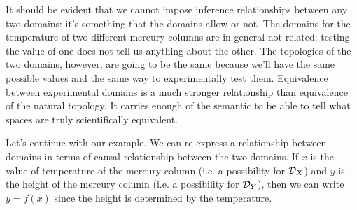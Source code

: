 \documentclass[11pt,letterpaper,fleqn]{memoir} %
\begin{document}
\begin{center}
\end{center}


It should be evident that we cannot impose inference relationships between any two domains: it's something that the domains allow or not. The domains for the temperature of two different mercury columns are in general not related: testing the value of one does not tell us anything about the other. The topologies of the two domains, however, are going to be the same because we'll have the same possible values and the same way to experimentally test them. Equivalence between experimental domains is a much stronger relationship than equivalence of the natural topology. It carries enough of the semantic to be able to tell what spaces are truly scientifically equivalent.

Let's continue with our example. We can re-express a relationship between domains in terms of causal relationship between the two domains. If $x$ is the value of temperature of the mercury column (i.e. a possibility for $\mathcal{D}_X$) and $y$ is the height of the mercury column (i.e. a possibility for $\mathcal{D}_Y$), then we can write $y=f(x)$ since the height is determined by the temperature.
\end{document}
